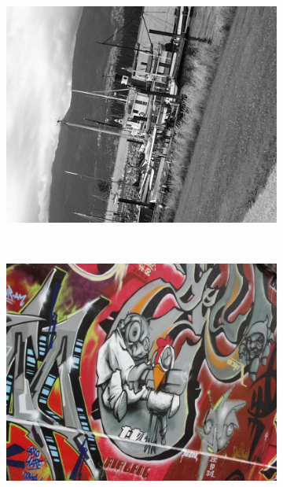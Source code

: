 \documentclass[review]{elsarticle}
\begin{document}
\begin{figure}[b]
    \begin{subfigure}[t]{0.20\columnwidth}
        \centering
        \includegraphics[width=1\columnwidth]{images/acr/boat4}
    \end{subfigure}%
    ~ %
    \begin{subfigure}[t]{0.20\columnwidth}
        \centering
        \includegraphics[width=1\columnwidth]{images/acr/graf3}
    \end{subfigure}%
    ~ %
    \begin{subfigure}[t]{0.23\columnwidth}
        \centering

\end{subfigure}
\end{figure}
\end{document}
